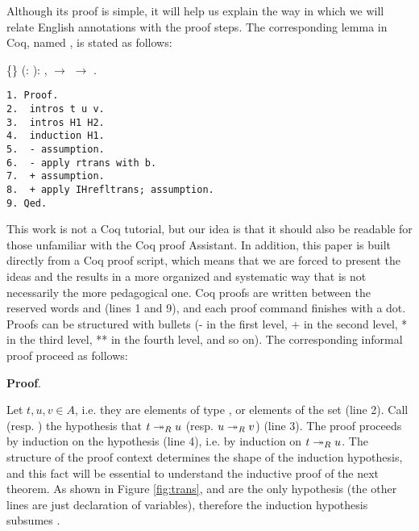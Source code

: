  Although its proof is simple, it will help us explain the way in which we will
relate English annotations with the proof steps. The corresponding
lemma in Coq, named , is stated as follows: \begin{coqdoccode}
\coqdocemptyline
\coqdocnoindent
{}  \{\} (:  ): \coqdockw{\ensuremath{\forall}}   ,     \ensuremath{\rightarrow}     \ensuremath{\rightarrow}    .\coqdoceol
\end{coqdoccode}
\begin{verbatim}
1. Proof.  
2.  intros t u v.  
3.  intros H1 H2.  
4.  induction H1.
5.  - assumption.  
6.  - apply rtrans with b.  
7.  + assumption.  
8.  + apply IHrefltrans; assumption.  
9. Qed. 
\end{verbatim}


This work is not a Coq tutorial, but our idea is that it should
also be readable for those unfamiliar with the Coq proof Assistant. In
addition, this paper is built directly from a Coq proof script, which
means that we are forced to present the ideas and the results in a
more organized and systematic way that is not necessarily the more
pedagogical one. Coq proofs are written between the reserved words
 and  (lines 1 and 9), and each proof command finishes
with a dot. Proofs can be structured with bullets (- in the first
level, + in the second level, * in the third level, ** in the fourth
level, and so on). The corresponding informal proof proceed as
follows: 

 {\bf Proof}.


    Let $t, u, v \in A$, i.e. they are elements of type , or
    elements of the set  (line 2). Call  (resp. ) the
    hypothesis that $t \twoheadrightarrow_R u$ (resp. $u\twoheadrightarrow_R v$) (line 3). The
    proof proceeds by induction on the hypothesis  (line 4),
    i.e. by induction on $t \twoheadrightarrow_R u$. The structure of the proof
    context determines the shape of the induction hypothesis, and this
    fact will be essential to understand the inductive proof of the
    next theorem. As shown in Figure \ref{fig:trans},  and 
    are the only hypothesis (the other lines are just declaration of
    variables), therefore the induction hypothesis subsumes .


